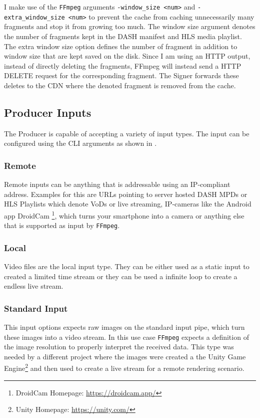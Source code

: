 I make use of the \texttt{FFmpeg} arguments \texttt{-window\_size <num>} and \texttt{-extra\_window\_size <num>} to prevent the cache from caching unnecessarily many fragments and stop it from growing too much. The window size argument denotes the number of fragments kept in the DASH manifest and HLS media playlist. The extra window size option defines the number of fragment in addition to window size that are kept saved on the disk. Since I am using an HTTP output, instead of directly deleting the fragments, FFmpeg will instead send a HTTP DELETE request for the corresponding fragment. The Signer forwards these deletes to the CDN where the denoted fragment is removed from the cache.

\subsection{Producer Inputs\label{sec:producer_inputs}}

The Producer is capable of accepting a variety of input types. The input can be configured using the CLI arguments as shown in .

\subsubsection{Remote}

Remote inputs can be anything that is addressable using an IP-compliant address. Examples for this are URLs pointing to server hosted DASH MPDs or HLS Playlists which denote VoDs or live streaming, IP-cameras like the Android app DroidCam \footnote{DroidCam Homepage: \url{https://droidcam.app/}}, which turns your smartphone into a camera or anything else that is supported as input by \texttt{FFmpeg}.

\subsubsection{Local}

Video files are the local input type. They can be either used as a static input to created a limited time stream or they can be used a infinite loop to create a endless live stream.

\subsubsection{Standard Input}

This input options expects raw images on the standard input pipe, which turn these images into a video stream. In this use case \texttt{FFmpeg} expects a definition of the image resolution to properly interpret the received data. This type was needed by a different project where the images were created a the Unity Game Engine\footnote{Unity Homepage: \url{https://unity.com/}} and then used to create a live stream for a remote rendering scenario.

